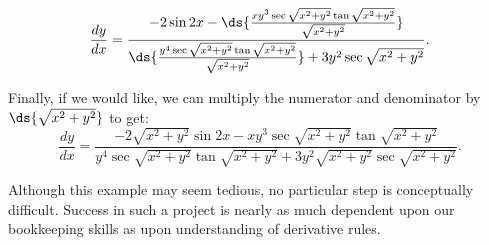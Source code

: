 $$\frac{dy}{dx}
=\frac{-2\sin2x-\ds{\frac{xy^3\sec\sqrt{x^2+y^2}\tan\sqrt{x^2+y^2}}
{\sqrt{x^2+y^2}}}}
{\ds{\frac{y^4\sec\sqrt{x^2+y^2}\tan\sqrt{x^2+y^2}}{\sqrt{x^2+y^2}}}
+3y^2\sec\sqrt{x^2+y^2}}.$$

Finally, if we would like, we can multiply the numerator
and denominator by $\ds{\sqrt{x^2+y^2}}$ to get:
$$\frac{dy}{dx}
=\frac{-2\sqrt{x^2+y^2}\sin2x-xy^3\sec\sqrt{x^2+y^2}\tan\sqrt{x^2+y^2}}
{y^4\sec\sqrt{x^2+y^2}\tan\sqrt{x^2+y^2}+3y^2\sqrt{x^2+y^2}
\sec\sqrt{x^2+y^2}}.$$



Although this example may seem tedious, no particular 
step is conceptually difficult.  Success in such
a project is nearly as much dependent upon our bookkeeping 
skills as upon understanding of derivative rules.

\eex

